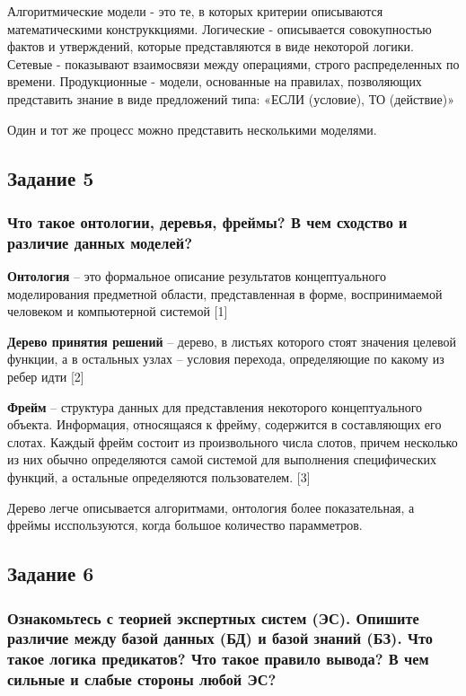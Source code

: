 \documentclass[14pt,a4paper,report]{report}
\begin{document}
Алгоритмические модели - это те, в которых критерии описываются математическими конструккциями. Логические - описывается совокупностью фактов и утверждений, которые представляются в виде некоторой логики. Сетевые - показывают взаимосвязи между операциями, строго распределенных по времени. Продукционные - модели, основанные на правилах, позволяющих представить знание в виде предложений типа: «ЕСЛИ (условие), ТО (действие)» 

Один и тот же процесс можно представить несколькими моделями. 

\subsection{Задание 5}

\subsubsection{Что такое онтологии, деревья, фреймы? В чем сходство и различие данных моделей?}

\textbf{Онтология} -- это формальное описание результатов концептуального моделирования предметной области, представленная в форме, воспринимаемой человеком и компьютерной системой [1]

\textbf{Дерево принятия решений} -- дерево, в листьях которого стоят значения целевой функции, а в остальных узлах -- условия перехода, определяющие по какому из ребер идти [2]

\textbf{Фрейм} -- структура данных для представления некоторого концептуального объекта. Информация, относящаяся к фрейму, содержится в составляющих его слотах. Каждый фрейм состоит из произвольного числа слотов, причем несколько из них обычно определяются самой системой для выполнения специфических функций, а остальные определяются пользователем. [3]

Дерево легче описывается алгоритмами, онтология более показательная, а фреймы исспользуются, когда большое количество парамметров.

\subsection{Задание 6}

\subsubsection{Ознакомьтесь с теорией экспертных систем (ЭС). Опишите различие между базой данных (БД) и базой знаний (БЗ). Что такое логика предикатов? Что такое правило вывода? В чем сильные и слабые стороны любой ЭС?}
\end{document}

